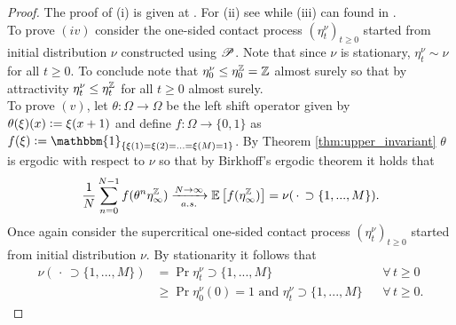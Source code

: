 \begin{proof}
The proof of (i) is given at \cite[page 902, top]{durrett1980growth}. For (ii) see \cite[Theorem 9.1]{harris1974contact} while (iii) can found in \cite[Lemma 5.2]{griffeath1979additive}. \\ 

To prove $(iv)$ consider the one-sided contact process $(\eta^\nu_t)_{t \geq 0}$ started from initial distribution $\nu$ constructed using $\mathscr{P}$. Note that since $\nu$ is stationary, $\eta^\nu_t \sim \nu$ for all $t \geq 0$. To conclude note that $\eta^\nu_0 \leq \eta^{\mathbb{Z}}_0 = \mathbb{Z}$ almost surely so that by attractivity $\eta^\nu_t \leq \eta^{\mathbb{Z}}_t$ for all $t \geq 0$ almost surely. \\

To prove $(v)$, let $\theta : \Omega \rightarrow \Omega$ be the left shift operator given by $\theta(\xi)(x) \vcentcolon= \xi(x + 1)$ and define $f : \Omega \rightarrow \{0, 1\}$ as $f(\xi) \defeq \mathbbm{1}_{\{\xi(1) = \xi(2) = ... = \xi(M) = 1\}}$. By Theorem \ref{thm:upper_invariant} $\theta$ is ergodic with respect to $\nu$ so that by Birkhoff's ergodic theorem it holds that 
\begin{equation} \label{eqn:birkhoff}
\frac{1}{N} \sum\limits^{N - 1}_{n = 0} f(\theta^n \eta^{\mathbb{Z}}_\infty) \xrightarrow[a.s.]{N \rightarrow \infty} \mathbb{E}\left[ f(\eta^{\mathbb{Z}}_\infty) \right] = \nu(\, \cdot\, \supset \{1, ..., M\} ). 
\end{equation}
Once again consider the supercritical one-sided contact process $(\eta^\nu_t)_{t \geq 0}$ started from initial distribution $\nu$. By stationarity it follows that
\begin{align*}
\nu(\, \cdot\, \supset \{1, ..., M\}) &= \Pr{\eta^\nu_t \supset \{1, ..., M\}}                                    && \forall\, t \geq 0 \\
									  &\geq \Pr{\eta^\nu_0 (0) = 1 \text{ and } \eta^\nu_t \supset \{1, ..., M\}} && \forall\, t \geq 0. 
\end{align*}


\end{proof}
